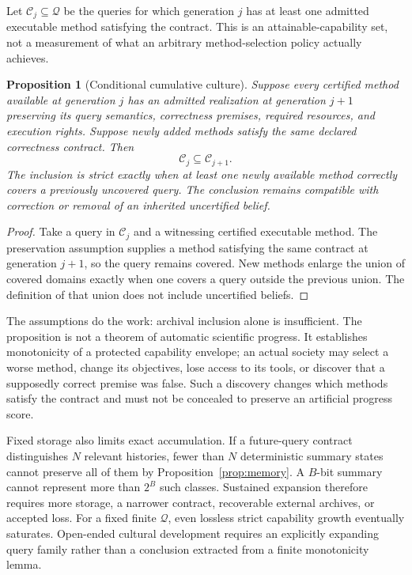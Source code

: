 \documentclass[11pt,letterpaper]{article}
\theoremstyle{plain}
\newtheorem{proposition}{Proposition}[section]
\theoremstyle{definition}
\theoremstyle{remark}
\begin{document}
Let $\mathcal C_j\subseteq\mathcal Q$ be the queries for which generation $j$ has at least one admitted executable method satisfying the contract. This is an attainable-capability set, not a measurement of what an arbitrary method-selection policy actually achieves.

\begin{proposition}[Conditional cumulative culture]\label{prop:culturegrowth}
Suppose every certified method available at generation $j$ has an admitted realization at generation $j+1$ preserving its query semantics, correctness premises, required resources, and execution rights. Suppose newly added methods satisfy the same declared correctness contract. Then
\[
\mathcal C_j\subseteq\mathcal C_{j+1}.
\]
The inclusion is strict exactly when at least one newly available method correctly covers a previously uncovered query. The conclusion remains compatible with correction or removal of an inherited \emph{uncertified} belief.
\end{proposition}
\begin{proof}
Take a query in $\mathcal C_j$ and a witnessing certified executable method. The preservation assumption supplies a method satisfying the same contract at generation $j+1$, so the query remains covered. New methods enlarge the union of covered domains exactly when one covers a query outside the previous union. The definition of that union does not include uncertified beliefs.
\end{proof}

The assumptions do the work: archival inclusion alone is insufficient. The proposition is not a theorem of automatic scientific progress. It establishes monotonicity of a protected capability envelope; an actual society may select a worse method, change its objectives, lose access to its tools, or discover that a supposedly correct premise was false. Such a discovery changes which methods satisfy the contract and must not be concealed to preserve an artificial progress score.

Fixed storage also limits exact accumulation. If a future-query contract distinguishes $N$ relevant histories, fewer than $N$ deterministic summary states cannot preserve all of them by Proposition~\ref{prop:memory}. A $B$-bit summary cannot represent more than $2^B$ such classes. Sustained expansion therefore requires more storage, a narrower contract, recoverable external archives, or accepted loss. For a fixed finite $\mathcal Q$, even lossless strict capability growth eventually saturates. Open-ended cultural development requires an explicitly expanding query family rather than a conclusion extracted from a finite monotonicity lemma.
\end{document}
